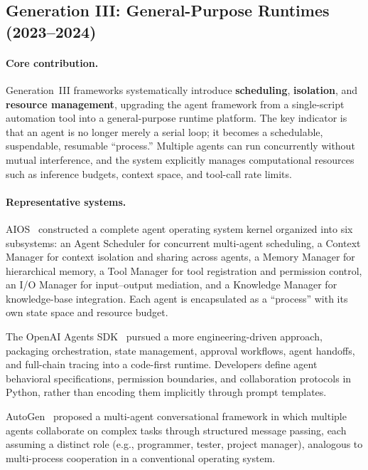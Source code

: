 \subsection{Generation III: General-Purpose Runtimes (2023--2024)}

\paragraph{Core contribution.}
Generation~III frameworks systematically introduce \textbf{scheduling}, \textbf{isolation}, and \textbf{resource management}, upgrading the agent framework from a single-script automation tool into a general-purpose runtime platform.
The key indicator is that an agent is no longer merely a serial loop; it becomes a schedulable, suspendable, resumable ``process.''
Multiple agents can run concurrently without mutual interference, and the system explicitly manages computational resources such as inference budgets, context space, and tool-call rate limits.

\paragraph{Representative systems.}
AIOS~\cite{mei2024aios} constructed a complete agent operating system kernel organized into six subsystems: an Agent Scheduler for concurrent multi-agent scheduling, a Context Manager for context isolation and sharing across agents, a Memory Manager for hierarchical memory, a Tool Manager for tool registration and permission control, an I/O Manager for input--output mediation, and a Knowledge Manager for knowledge-base integration.
Each agent is encapsulated as a ``process'' with its own state space and resource budget.

The OpenAI Agents SDK~\cite{openai_codex_agentsdk_2026} pursued a more engineering-driven approach, packaging orchestration, state management, approval workflows, agent handoffs, and full-chain tracing into a code-first runtime.
Developers define agent behavioral specifications, permission boundaries, and collaboration protocols in Python, rather than encoding them implicitly through prompt templates.

AutoGen~\cite{wu2023autogen} proposed a multi-agent conversational framework in which multiple agents collaborate on complex tasks through structured message passing, each assuming a distinct role (e.g., programmer, tester, project manager), analogous to multi-process cooperation in a conventional operating system.

